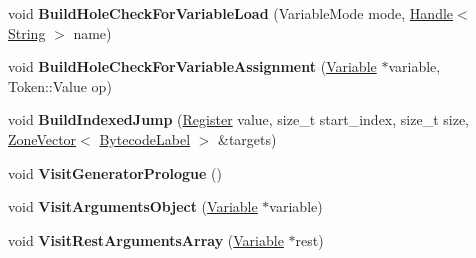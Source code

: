 \begin{DoxyCompactItemize}
\item 
void {\bfseries Build\+Hole\+Check\+For\+Variable\+Load} (Variable\+Mode mode, \hyperlink{classv8_1_1internal_1_1_handle}{Handle}$<$ \hyperlink{classv8_1_1internal_1_1_string}{String} $>$ name)\hypertarget{classv8_1_1internal_1_1interpreter_1_1_bytecode_generator_ad1b35710d0a21580b62f0243e229ba69}{}\label{classv8_1_1internal_1_1interpreter_1_1_bytecode_generator_ad1b35710d0a21580b62f0243e229ba69}

\item 
void {\bfseries Build\+Hole\+Check\+For\+Variable\+Assignment} (\hyperlink{classv8_1_1internal_1_1compiler_1_1_code_assembler_1_1_variable}{Variable} $\ast$variable, Token\+::\+Value op)\hypertarget{classv8_1_1internal_1_1interpreter_1_1_bytecode_generator_a0ddaf27eb189c062f9e2938fd539e2d6}{}\label{classv8_1_1internal_1_1interpreter_1_1_bytecode_generator_a0ddaf27eb189c062f9e2938fd539e2d6}

\item 
void {\bfseries Build\+Indexed\+Jump} (\hyperlink{classv8_1_1internal_1_1interpreter_1_1_register}{Register} value, size\+\_\+t start\+\_\+index, size\+\_\+t size, \hyperlink{classv8_1_1internal_1_1_zone_vector}{Zone\+Vector}$<$ \hyperlink{classv8_1_1internal_1_1interpreter_1_1_bytecode_label}{Bytecode\+Label} $>$ \&targets)\hypertarget{classv8_1_1internal_1_1interpreter_1_1_bytecode_generator_af04c49b2b9c07233b5fcb06148b79ef5}{}\label{classv8_1_1internal_1_1interpreter_1_1_bytecode_generator_af04c49b2b9c07233b5fcb06148b79ef5}

\item 
void {\bfseries Visit\+Generator\+Prologue} ()\hypertarget{classv8_1_1internal_1_1interpreter_1_1_bytecode_generator_a78df59fe4a2ff7fe07e201f3371d1904}{}\label{classv8_1_1internal_1_1interpreter_1_1_bytecode_generator_a78df59fe4a2ff7fe07e201f3371d1904}

\item 
void {\bfseries Visit\+Arguments\+Object} (\hyperlink{classv8_1_1internal_1_1compiler_1_1_code_assembler_1_1_variable}{Variable} $\ast$variable)\hypertarget{classv8_1_1internal_1_1interpreter_1_1_bytecode_generator_adcf05c3d3f41624448f0e79dbda31e36}{}\label{classv8_1_1internal_1_1interpreter_1_1_bytecode_generator_adcf05c3d3f41624448f0e79dbda31e36}

\item 
void {\bfseries Visit\+Rest\+Arguments\+Array} (\hyperlink{classv8_1_1internal_1_1compiler_1_1_code_assembler_1_1_variable}{Variable} $\ast$rest)\hypertarget{classv8_1_1internal_1_1interpreter_1_1_bytecode_generator_a7cce0d46222645bd27caafc91273b2fe}{}\label{classv8_1_1internal_1_1interpreter_1_1_bytecode_generator_a7cce0d46222645bd27caafc91273b2fe}


\end{DoxyCompactItemize}
